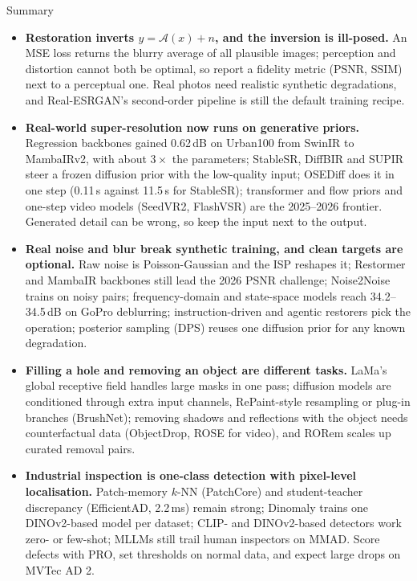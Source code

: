 \begin{frame}[allowframebreaks]{Summary}
  \begin{itemize}\scriptsize\itemsep0.35em
    \item \textbf{Restoration inverts $y = \mathcal{A}(x) + n$, and the inversion is ill-posed.} An MSE loss returns the blurry average of all plausible images; perception and distortion cannot both be optimal, so report a fidelity metric (PSNR, SSIM) next to a perceptual one. Real photos need realistic synthetic degradations, and Real-ESRGAN's second-order pipeline is still the default training recipe.
    \item \textbf{Real-world super-resolution now runs on generative priors.} Regression backbones gained 0.62\,dB on Urban100 from SwinIR to MambaIRv2, with about $3\times$ the parameters; StableSR, DiffBIR and SUPIR steer a frozen diffusion prior with the low-quality input; OSEDiff does it in one step (0.11\,s against 11.5\,s for StableSR); transformer and flow priors and one-step video models (SeedVR2, FlashVSR) are the 2025--2026 frontier. Generated detail can be wrong, so keep the input next to the output.
    \item \textbf{Real noise and blur break synthetic training, and clean targets are optional.} Raw noise is Poisson-Gaussian and the ISP reshapes it; Restormer and MambaIR backbones still lead the 2026 PSNR challenge; Noise2Noise trains on noisy pairs; frequency-domain and state-space models reach 34.2--34.5\,dB on GoPro deblurring; instruction-driven and agentic restorers pick the operation; posterior sampling (DPS) reuses one diffusion prior for any known degradation.
    \item \textbf{Filling a hole and removing an object are different tasks.} LaMa's global receptive field handles large masks in one pass; diffusion models are conditioned through extra input channels, RePaint-style resampling or plug-in branches (BrushNet); removing shadows and reflections with the object needs counterfactual data (ObjectDrop, ROSE for video), and RORem scales up curated removal pairs.
    \item \textbf{Industrial inspection is one-class detection with pixel-level localisation.} Patch-memory $k$-NN (PatchCore) and student-teacher discrepancy (EfficientAD, 2.2\,ms) remain strong; Dinomaly trains one DINOv2-based model per dataset; CLIP- and DINOv2-based detectors work zero- or few-shot; MLLMs still trail human inspectors on MMAD. Score defects with PRO, set thresholds on normal data, and expect large drops on MVTec AD 2.

\end{itemize}
\end{frame}
